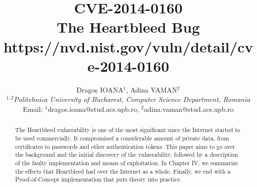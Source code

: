 \documentclass[12pt,a4paper,english,onecolumn]{IEEEtran}
\begin{document}


\title{\Large\textbf{{CVE-2014-0160}} \\
\large{The Heartbleed Bug} \\
\vspace{10px}
\small{https://nvd.nist.gov/vuln/detail/cve-2014-0160}
}

\author{Dragoș IOANA$^{1}$, Adina VAMAN$^{2}$\\
$^{1, 2}$\emph{Politehnica University of Bucharest, Computer Science Department, Romania}\\
Email: $^{1}$dragos.ioana@stud.acs.upb.ro, $^{2}$adina.vaman@stud.acs.upb.ro}

\maketitle

\begin{abstract}

The Heartbleed vulnerability is one of the most significant since the Internet started to be used commercially. It compromised a considerable amount of private data, from certificates to passwords and other authentication tokens. This paper aims to go over the background and the initial discovery of the vulnerability, followed by a description of the faulty implementation and means of exploitation. In Chapter IV, we summarize the effects that Heartbleed had over the Internet as a whole. Finally, we end with a Proof-of-Concept implementation that puts theory into practice.

\end{abstract}
\end{document}
